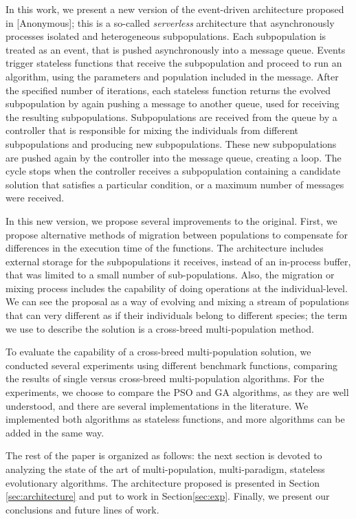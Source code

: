 \documentclass[runningheads]{llncs}
\begin{document}
In this work, we present a new version of the event-driven architecture proposed
in [Anonymous]; this is a so-called {\em serverless} architecture that
asynchronously processes isolated and heterogeneous subpopulations. Each
subpopulation is treated as an event, that is pushed asynchronously into a
message queue. Events trigger stateless functions that receive the subpopulation
and proceed to run an algorithm, using the parameters and population included in
the message. After the specified number of iterations, each stateless function
returns the evolved subpopulation by again pushing a message to another queue,
used for receiving the resulting subpopulations. Subpopulations are received
from the queue by a controller that is responsible for mixing the individuals
from different subpopulations and producing new subpopulations. These new
subpopulations are pushed again by the controller into the message queue,
creating a loop. The cycle stops when the controller receives a subpopulation
containing a candidate solution that satisfies a particular condition, or a
maximum number of messages were received. 

In this new version, we propose several improvements to the original. First, we
propose alternative methods of migration between populations to compensate for
differences in the execution time of the functions. The architecture includes
external storage for the subpopulations it receives, instead of an in-process
buffer, that was limited to a small number of sub-populations. Also, the
migration or mixing process includes the capability of doing operations at the
individual-level. 
We can see the proposal as a way of evolving and mixing a
stream of populations that can very different as if their individuals belong to
different species; the term we use to describe the solution is a cross-breed
multi-population method.

To evaluate the capability of a cross-breed multi-population solution,
we conducted several experiments using different benchmark functions, comparing the
results of single versus cross-breed multi-population algorithms. For the experiments, we choose to
compare the PSO and GA algorithms, as they are well understood, and there are
several implementations in the literature. We implemented both algorithms as
stateless functions, and more algorithms can be added in the same way.

The rest of the paper is organized as follows: the next section is devoted
to analyzing the state of the art of multi-population, multi-paradigm,
stateless evolutionary algorithms. The architecture proposed is
presented in Section \ref{sec:architecture} and put to work in Section\ref{sec:exp}.
Finally, we present our conclusions and future lines of work.
\end{document}
